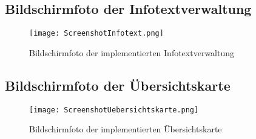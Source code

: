 


\subsection{Bildschirmfoto der Infotextverwaltung}
\label{sec:BildschirmfotoInfotextverwaltung}

\begin{figure}[htb]
\texttt{[image: ScreenshotInfotext.png]}
\caption[Bildschirmfoto Infotexte]{Bildschirmfoto der implementierten Infotextverwaltung}
\label{fig:ScreenshotInfotext}
\end{figure}
\centering

\subsection{Bildschirmfoto der Übersichtskarte}
\label{sec:BildschirmfotoUebersichtskarte}

\begin{figure}[htb]
\texttt{[image: ScreenshotUebersichtskarte.png]}
\caption[Bildschirmfoto Übersichtskarte]{Bildschirmfoto der implementierten Übersichtskarte}
\label{fig:ScreenshotUebersichtskarte}
\end{figure}
\centering
